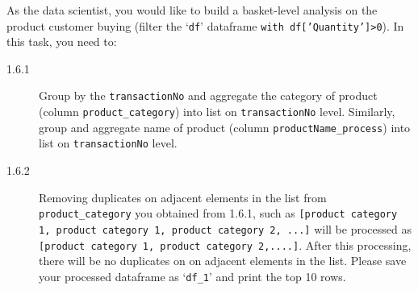 \documentclass[a4paper]{article}
\begin{document}
    \begin{answer}[Question 1.6]
    As the data scientist, you would like to build a basket-level analysis on the product customer buying (filter the `\texttt{df}' dataframe \texttt{with df['Quantity']>0}).
    In this task, you need to:
    \begin{description}
        \item[1.6.1] Group by the \texttt{transactionNo} and aggregate the category of product (column \texttt{product_category}) into list on \texttt{transactionNo} level.
        Similarly, group and aggregate name of product (column \texttt{productName_process}) into list on \texttt{transactionNo} level.
        \item[1.6.2] Removing duplicates on adjacent elements in the list from \texttt{product_category} you obtained from 1.6.1, such as \texttt{[product category 1, product category 1, product category 2, ...]} will be processed as \texttt{[product category 1, product category 2,....]}. After this processing, there will be no duplicates on on adjacent elements in the list. Please save your processed dataframe as `\texttt{df_1}' and print the top 10 rows.
    \end{description}
    \end{answer}
\end{document}
